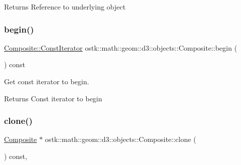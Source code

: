 \begin{DoxyReturn}{Returns}
Reference to underlying object 
\end{DoxyReturn}
\mbox{\label{classostk_1_1math_1_1geom_1_1d3_1_1objects_1_1_composite_ab94b6cd4186515bdc1fa246756fec3cb}} 
\subsubsection{\texorpdfstring{begin()}{begin()}}
{\footnotesize\ttfamily \hyperlink{classostk_1_1math_1_1geom_1_1d3_1_1objects_1_1_composite_ab1f78408fec2e435dc1172cf2675b0a9}{Composite\+::\+Const\+Iterator} ostk\+::math\+::geom\+::d3\+::objects\+::\+Composite\+::begin (\begin{DoxyParamCaption}{ }\end{DoxyParamCaption}) const}



Get const iterator to begin. 

\begin{DoxyReturn}{Returns}
Const iterator to begin 
\end{DoxyReturn}
\mbox{\label{classostk_1_1math_1_1geom_1_1d3_1_1objects_1_1_composite_a3fa42c990116bf5537c943c404fa8fdd}} 
\subsubsection{\texorpdfstring{clone()}{clone()}}
{\footnotesize\ttfamily \hyperlink{classostk_1_1math_1_1geom_1_1d3_1_1objects_1_1_composite}{Composite} $\ast$ ostk\+::math\+::geom\+::d3\+::objects\+::\+Composite\+::clone (\begin{DoxyParamCaption}{ }\end{DoxyParamCaption}) const\hspace{0.3cm}{\ttfamily [override]}, {\ttfamily [virtual]}}



